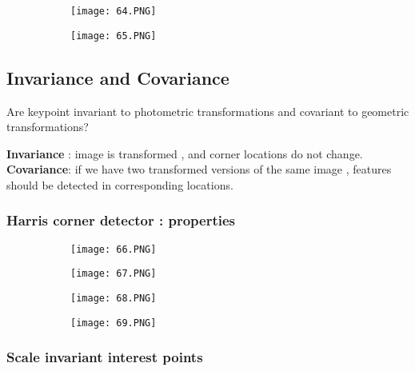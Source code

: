 \documentclass{article}
\begin{document}
\begin{figure}[ht!]
  \centering
  \begin{subfigure}[b]{0.4\linewidth}
    \texttt{[image: 64.PNG]}
  \end{subfigure}
  \begin{subfigure}[b]{0.4\textwidth}
         \centering
         \texttt{[image: 65.PNG]}
     \end{subfigure}
\end{figure}


\subsection{Invariance and Covariance}

Are keypoint invariant to photometric transformations and covariant to geometric transformations?

\textbf{Invariance} : image is transformed , and corner locations do not change.
\textbf{Covariance}: if we have two transformed versions of the same image , features should be detected in corresponding locations.

\subsubsection{Harris corner detector : properties}

\begin{figure}[ht!]
  \centering
  \begin{subfigure}[b]{0.4\linewidth}
    \texttt{[image: 66.PNG]}
  \end{subfigure}
  \begin{subfigure}[b]{0.4\textwidth}
         \centering
         \texttt{[image: 67.PNG]}
     \end{subfigure}
\end{figure}

\begin{figure}[ht!]
  \centering
  \begin{subfigure}[b]{0.4\linewidth}
    \texttt{[image: 68.PNG]}
  \end{subfigure}
  \begin{subfigure}[b]{0.4\textwidth}
         \centering
         \texttt{[image: 69.PNG]}
     \end{subfigure}
\end{figure}

\subsubsection{Scale invariant interest points}
\end{document}
